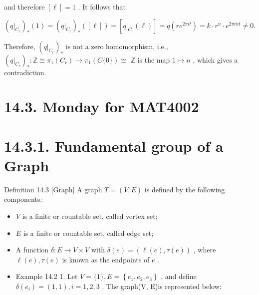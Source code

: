 and therefore \(\left\lbrack  \ell \right\rbrack   = 1\) . It follows that

\[
{\left( {\left. q\right| }_{{C}_{r}}\right) }_{ * }\left( 1\right)  = {\left( {\left. q\right| }_{{C}_{r}}\right) }_{ * }\left( \left\lbrack  \ell \right\rbrack  \right)  = \left\lbrack  {{\left. q\right| }_{{C}_{r}}\left( \ell \right) }\right\rbrack   = q\left( {r{e}^{2\pi it}}\right)  = k \cdot  {r}^{n} \cdot  {e}^{2\pi int} \neq  0.
\]

Therefore, \({\left( {\left. q\right| }_{{C}_{r}}\right) }_{ * }\) is not a zero homomorphism, i.e., \({\left( {\left. q\right| }_{{C}_{r}}\right) }_{ * } : \mathbb{Z} \cong  {\pi }_{1}\left( {C}_{r}\right)  \rightarrow  {\pi }_{1}\left( {C\{ 0\} }\right)  \cong\)  \(\mathbb{Z}\) is the map \(1 \mapsto  n\) , which gives a contradiction.

\section*{14.3. Monday for MAT4002}

\section*{14.3.1. Fundamental group of a Graph}

Definition 14.3 [Graph] A graph \(T = \left( {V,E}\right)\) is defined by the following components:

\begin{itemize}
\item \(V\) is a finite or countable set, called vertex set;
\end{itemize}

\begin{itemize}
\item \(E\) is a finite or countable set, called edge set;
\end{itemize}

\begin{itemize}
\item A function \(\delta  : E \rightarrow  V \times  V\) with \(\delta \left( e\right)  = \left( {\ell \left( e\right) ,\tau \left( e\right) }\right)\) , where \(\ell \left( e\right) ,\tau \left( e\right)\) is known as the endpoints of \(e\) .
\end{itemize}

\begin{itemize}
\item Example 14.2 1. Let \(V = \{ 1\} ,E = \left\{  {{e}_{1},{e}_{2},{e}_{3}}\right\}\) , and define \(\delta \left( {e}_{i}\right)  = \left( {1,1}\right) ,i = 1,2,3\) . The graph(V, E)is represented below:
\end{itemize}

